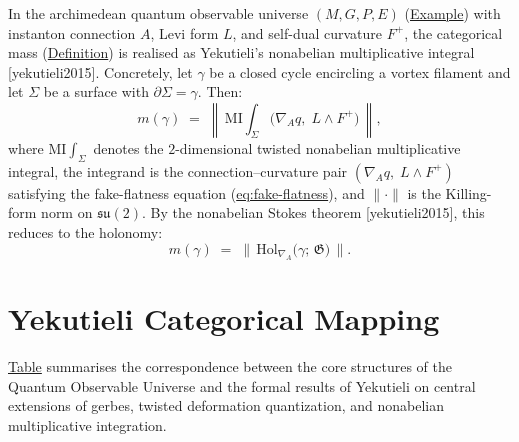 \begin{corollary}
  \label{cor:mass-identity-C}
In the archimedean quantum observable universe $(M, G, P, E)$
(\hyperref[def:c-quantum-observable-universe]{Example}) with instanton
connection $A$, Levi form $L$, and self-dual curvature $F^+$, the
categorical mass (\hyperref[def:mass-identity]{Definition}) is realised as
Yekutieli's nonabelian multiplicative integral [yekutieli2015].
Concretely, let $\gamma$ be a closed cycle encircling a vortex filament
and let $\Sigma$ be a surface with $\partial\Sigma = \gamma$.  Then:
\[
m(\gamma) \;=\;
  \left\lVert\,
  \mathrm{MI}\!\!\int_\Sigma
  \bigl(\nabla_A q,\; L \wedge F^+\bigr)
  \,\right\rVert,
\]
where $\mathrm{MI}\!\int_\Sigma$ denotes the $2$-dimensional twisted
nonabelian multiplicative integral, the integrand is the
connection--curvature pair $(\nabla_A q,\; L \wedge F^+)$ satisfying
the fake-flatness equation (\hyperref[eq:fake-flatness]{eq:fake-flatness}), and
$\lVert\cdot\rVert$ is the Killing-form norm on $\mathfrak{su}(2)$.
By the nonabelian Stokes theorem [yekutieli2015], this reduces to
the holonomy:
\[
m(\gamma) \;=\;
  \bigl\lVert\,
  \mathrm{Hol}_{\nabla_A}\!\bigl(\gamma;\, \mathfrak{G}\bigr)
  \,\bigr\rVert.
\]
\end{corollary}

\section{Yekutieli Categorical Mapping}
\label{sec:yekutieli-mapping}

\hyperref[tab:yekutieli-mapping]{Table} summarises the correspondence between the
core structures of the Quantum Observable Universe and the formal results
of Yekutieli on central extensions of gerbes, twisted deformation
quantization, and nonabelian multiplicative integration.

